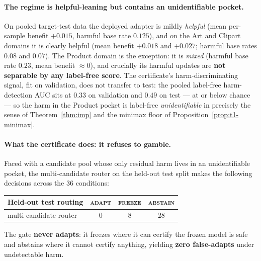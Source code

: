 \paragraph{The regime is helpful-leaning but contains an unidentifiable pocket.}
On pooled target-test data the deployed adapter is mildly \emph{helpful}
(mean per-sample benefit $+0.015$, harmful base rate $0.125$), and on the Art and
Clipart domains it is clearly helpful (mean benefit $+0.018$ and $+0.027$; harmful
base rates $0.08$ and $0.07$).  The Product domain is the exception: it is
\emph{mixed} (harmful base rate $0.23$, mean benefit $\approx 0$), and crucially
its harmful updates are \textbf{not separable by any label-free score}.  The
certificate's harm-discriminating signal, fit on validation, does not transfer to
test: the pooled label-free harm-detection AUC sits at $0.33$ on validation and
$0.49$ on test --- at or below chance --- so the harm in the Product pocket is
label-free \emph{unidentifiable} in precisely the sense of
Theorem~\ref{thm:imp} and the minimax floor of
Proposition~\ref{prop:t1-minimax}.

\paragraph{What the certificate does: it refuses to gamble.}
Faced with a candidate pool whose only residual harm lives in an unidentifiable
pocket, the multi-candidate router on the held-out test split makes the following
decisions across the $36$ conditions:

\begin{center}
\begin{tabular}{lccc}
\toprule
Held-out test routing & \textsc{adapt} & \textsc{freeze} & \textsc{abstain} \\
\midrule
\KGA{} multi-candidate router & $0$ & $8$ & $28$ \\
\bottomrule
\end{tabular}
\end{center}

The gate \textbf{never adapts}: it freezes where it can certify the frozen model is
safe and abstains where it cannot certify anything, yielding \textbf{zero
false-adapts} under undetectable harm.

